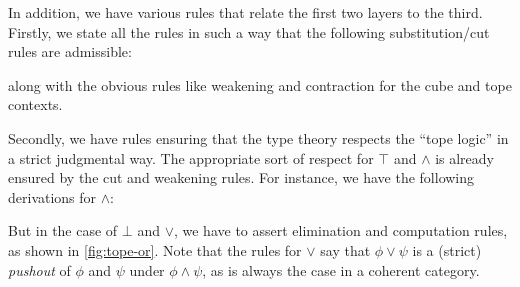 \documentclass{amsart}
\theoremstyle{plain}
\theoremstyle{definition}
\theoremstyle{remark}
\numberwithin{equation}{section}
\newcommand{\types}{\vdash}
\begin{document}
In addition, we have various rules that relate the first two layers to the third.
Firstly, we state all the rules in such a way that the following substitution/cut rules are admissible:
along with the obvious rules like weakening and contraction for the cube and tope contexts.

Secondly, we have rules ensuring that the type theory respects the ``tope logic'' in a strict judgmental way.
The appropriate sort of respect for $\top$ and $\land$ is already ensured by the cut and weakening rules.
For instance, we have the following derivations for $\land$:
But in the case of $\bot$ and $\lor$, we have to assert elimination and computation rules, as shown in \cref{fig:tope-or}.
Note that the rules for $\lor$ say that $\phi\lor\psi$ is a (strict) \emph{pushout} of $\phi$ and $\psi$ under $\phi\land\psi$, as is always the case in a coherent category.
\end{document}
